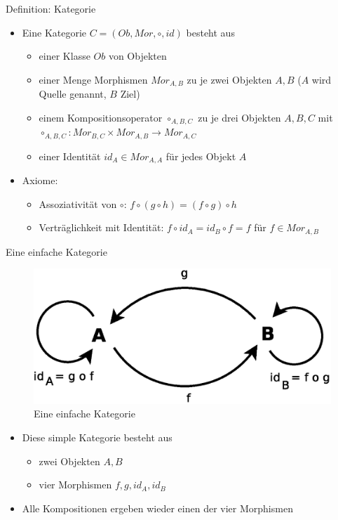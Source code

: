 \documentclass{beamer}
\begin{document}
\begin{frame}{Definition: Kategorie}
  \begin{itemize}
  \item Eine Kategorie $C = (Ob, Mor, \circ, id)$ besteht aus  
    \begin{itemize}
    \item einer Klasse $Ob$ von Objekten
    \item einer Menge Morphismen $Mor_{A,B}$ zu je zwei Objekten $A, B$
      ($A$ wird Quelle genannt, $B$ Ziel)
    \item einem Kompositionsoperator $\circ_{A,B,C}$ zu je drei Objekten
      $A, B, C$ mit 
      $\circ_{A,B,C} : Mor_{B,C} \times Mor_{A,B} \rightarrow Mor_{A,C}$
    \item einer Identität $id_A \in Mor_{A,A}$ für jedes Objekt $A$
    \end{itemize}

  \item Axiome:
    \begin{itemize}
    \item Assoziativität von $\circ$:
      $f \circ (g \circ h) = (f \circ g) \circ h$
    \item Verträglichkeit mit Identität:
      $f \circ id_A = id_B \circ f = f$ für $f \in Mor_{A,B}$
    \end{itemize}
  \end{itemize}
\end{frame}

\begin{frame}{Eine einfache Kategorie}
  \begin{figure}
    \centering
    \includegraphics[scale=0.4]{images/cat_simple}
    \caption{Eine einfache Kategorie}
  \end{figure}
  \begin{itemize}
  \item Diese simple Kategorie besteht aus
    \begin{itemize}
    \item zwei Objekten $A, B$
    \item vier Morphismen $f, g, id_A, id_B$
    \end{itemize}
  \item Alle Kompositionen ergeben wieder einen der vier Morphismen
  \end{itemize}
\end{frame}
\end{document}
